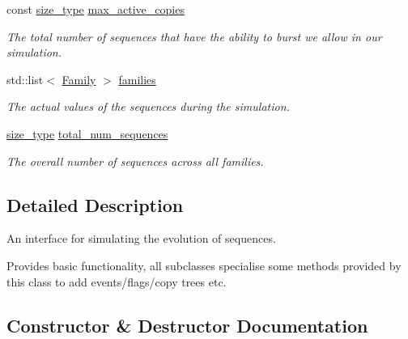\begin{DoxyCompactItemize}
\mbox{\label{classretrocombinator_1_1Evolution_a0e6b2c75bdc36f8f482162f2f8c67d56}} 
const \hyperlink{constants_8h_a8e1541b50cee66a791df4c437ccbb385}{size\+\_\+type} \hyperlink{classretrocombinator_1_1Evolution_a0e6b2c75bdc36f8f482162f2f8c67d56}{max\+\_\+active\+\_\+copies}
\begin{DoxyCompactList}\small\item\em The total number of sequences that have the ability to burst we allow in our simulation. \end{DoxyCompactList}\item 
std\+::list$<$ \hyperlink{classretrocombinator_1_1Family}{Family} $>$ \hyperlink{classretrocombinator_1_1Evolution_a163715452c511724ecc0ef16a5030dea}{families}
\begin{DoxyCompactList}\small\item\em The actual values of the sequences during the simulation. \end{DoxyCompactList}\item 
\mbox{\label{classretrocombinator_1_1Evolution_abc218e27bae28eb73089e56cc8b51b4e}} 
\hyperlink{constants_8h_a8e1541b50cee66a791df4c437ccbb385}{size\+\_\+type} \hyperlink{classretrocombinator_1_1Evolution_abc218e27bae28eb73089e56cc8b51b4e}{total\+\_\+num\+\_\+sequences}
\begin{DoxyCompactList}\small\item\em The overall number of sequences across all families. \end{DoxyCompactList}\end{DoxyCompactItemize}


\subsection{Detailed Description}
An interface for simulating the evolution of sequences. 

Provides basic functionality, all subclasses specialise some methods provided by this class to add events/flags/copy trees etc. 

\subsection{Constructor \& Destructor Documentation}
\mbox{\label{classretrocombinator_1_1Evolution_a0aa94cf8dd5f6184535faf82842337fd}} 
